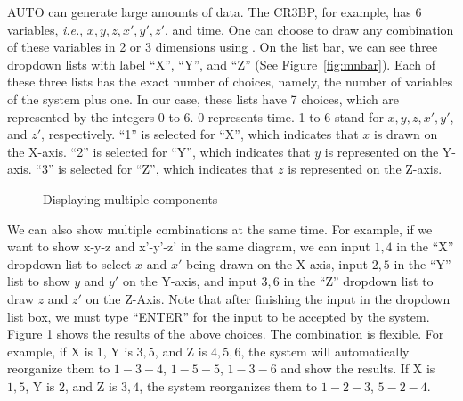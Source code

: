AUTO can generate large amounts of data. The CR3BP, for example, has 6 variables, \textit{i.e.}, $x,y,
z, x', y', z'$, and time. One can choose to draw any combination of these variables in 2  
or 3 dimensions using \PLAUT. On the list bar,  
we can see three {dropdown lists} with label ``X'', ``Y'', and ``Z'' (See Figure~\ref{fig:mnbar}).
Each of these three lists has the exact number of choices, namely, the number of variables of the system plus one.
In our case, these lists have 7 choices, which are represented by the integers 0 to 6. 
0 represents time. 1 to 6 stand for $x, y, z, x', y'$, and $z'$, respectively. 
``1'' is selected for ``X'', which indicates that $x$ is drawn on the X-axis. 
``2'' is selected for ``Y'',  which indicates that $y$ is represented on the Y-axis. 
``3'' is selected for ``Z'',  which indicates that $z$ is represented on the Z-axis. 

\begin{figure}[!htmb]
\centering
{}
\caption{Displaying multiple components}
\label{fig:twoPairs}
\end{figure}

We can also show multiple combinations at the same time. For example, if we want 
to show x-y-z and x'-y'-z' in the same diagram, we can input $1,4$ in the ``X'' \textrm{dropdown list} to 
select $x$ and $x'$ being drawn on the X-axis, input $2,5$ in the ``Y'' list to show $y$ and $y'$ on the Y-axis,
and input $3,6$ in the ``Z'' \textrm{dropdown list} to draw $z$ and $z'$ on the Z-Axis. Note that after finishing 
the input in the \textrm{dropdown list} box, we must type ``ENTER'' for  
the input to be accepted by the system. Figure \ref{fig:twoPairs} shows the results of the above
choices. The combination is flexible. For example, if X is $1$, Y is $3, 5$, and Z is $4, 5, 6$, 
the system will automatically reorganize them to $1-3-4$, $1-5-5$, $1-3-6$ and show the results.
If X is $1, 5$,  Y is $2$, and Z is $3, 4$, the system reorganizes them to $1-2-3$, $5-2-4$.

